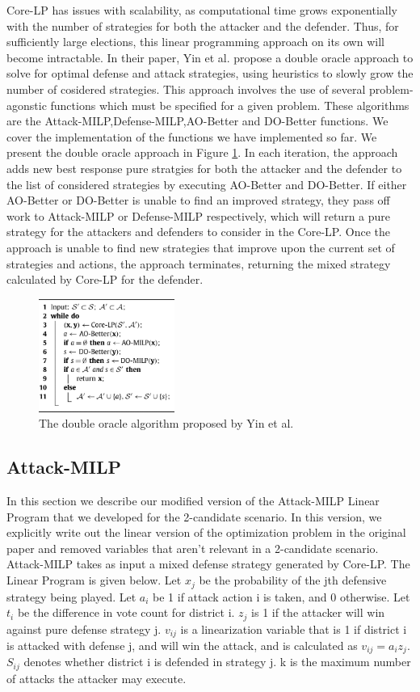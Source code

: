 \documentclass[letterpaper]{article} %
\begin{document}
Core-LP has issues with scalability, as computational time grows exponentially with the number of strategies for both the attacker and the defender. Thus, for sufficiently large elections, this linear programming approach on its own will become intractable. In their paper, Yin et al. propose a double oracle approach to solve for optimal defense and attack strategies, using heuristics to slowly grow the number of cosidered strategies. This approach involves the use of several problem-agonstic functions which must be specified for a given problem. These algorithms are the Attack-MILP,Defense-MILP,AO-Better and DO-Better functions. We cover the implementation of the functions we have implemented so far. We present the double oracle approach in Figure \ref{fig:doubleoracle}. In each iteration, the approach adds new best response pure stratgies for both the attacker and the defender to the list of considered strategies by executing AO-Better and DO-Better. If either AO-Better or DO-Better is unable to find an improved strategy, they pass off work to Attack-MILP or Defense-MILP respectively, which will return a pure strategy for the attackers and defenders to consider in the Core-LP. Once the approach is unable to find new strategies that improve upon the current set of strategies and actions, the approach terminates, returning the mixed strategy calculated by Core-LP for the defender. 

\begin{figure}[!h]
  \centering
  \includegraphics[height=10em]{doubleoracle.jpg}
  \caption{The double oracle algorithm proposed by Yin et al.}
  \label{fig:doubleoracle}
\end{figure}

\subsection{Attack-MILP}
In this section we describe our modified version of the Attack-MILP Linear Program that we developed for the 2-candidate scenario. In this version, we explicitly write out the linear version of the optimization problem in the original paper and removed variables that aren't relevant in a 2-candidate scenario. Attack-MILP takes as input a mixed defense strategy generated by Core-LP. The Linear Program is given below.
Let $x_j$ be the probability of the jth defensive strategy being played. Let $a_i$ be 1 if attack action i is taken, and 0 otherwise. Let $t_i$ be the difference in vote count for district i. $z_j$ is 1 if the attacker will win against pure defense strategy j. $v_{ij}$ is a linearization variable that is 1 if district i is attacked with defense j, and will win the attack, and is calculated as $v_{ij} = a_iz_j$. $S_{ij}$ denotes whether district i is defended in strategy j. k is the maximum number of attacks the attacker may execute. 
\end{document}
